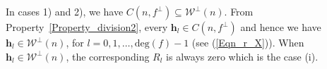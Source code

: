 \documentclass[10pt,journal]{IEEEtran}
\def \deg{{\mathrm{deg}}}
\begin{document}
\begin{IEEEproof}
% 
% 
% 
% 
% 
% 
% 
% 	  
% 

In cases 1) and 2), we have $C(n,f^{\perp}) \subseteq \mathcal{W}^{\perp}(n)$.
From Property~\ref{Property_division2}, every $\mathbf{h}_l \in C(n,f^{\perp})$ 
and hence we have $\mathbf{h}_l \in \mathcal{W}^{\perp}(n)$,
for $l = 0, 1, \ldots, \deg(f)-1$ (see (\ref{Eqn_r_X})).
When $\mathbf{h}_l \in \mathcal{W}^{\perp}(n)$, the corresponding $R_l$ is always zero
which is the case (i).


\end{IEEEproof}
\end{document}
